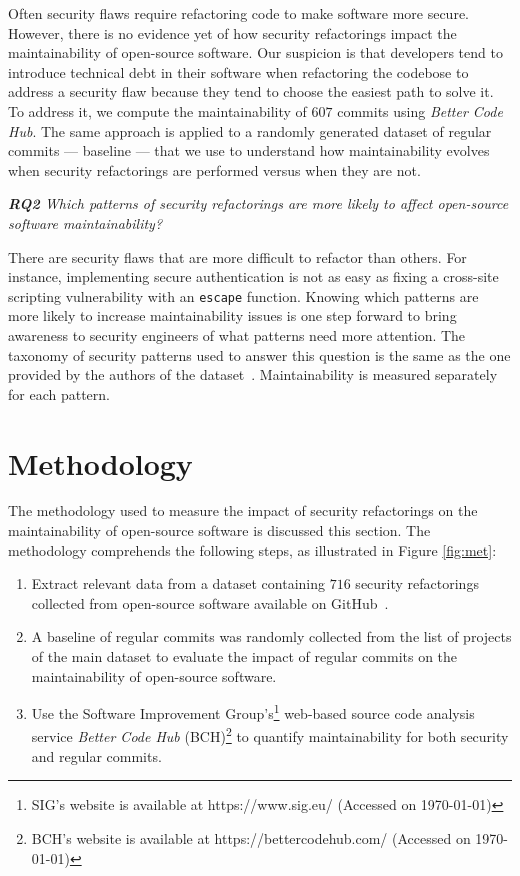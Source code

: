 \documentclass[10pt,conference]{IEEEtran}
\begin{document}
Often security flaws require refactoring code to make software more secure.
However, there is no evidence yet of how security refactorings impact the
maintainability of open-source software. Our suspicion is that developers tend
to introduce technical debt in their software when refactoring the codebose to
address a security flaw because they tend to choose the easiest path to solve
it. To address it, we compute the maintainability of $607$ commits using
\emph{Better Code Hub}. The same approach is applied to a randomly generated
dataset of regular commits --- baseline --- that we use to understand how
maintainability evolves when security refactorings are performed versus when
they are not.

\begin{framed}
\textit{\textbf{RQ2} Which patterns of security refactorings are more likely to
affect open-source software maintainability?}
\end{framed}

There are security flaws that are more difficult to refactor than others. For
instance, implementing secure authentication is not as easy as fixing a cross-site scripting vulnerability with an \texttt{escape}
function. Knowing which patterns are more likely to increase maintainability
issues is one step forward to bring awareness to security engineers of what
patterns need more attention. The taxonomy of security patterns used to answer
this question is the same as the one provided by the authors of the dataset~\cite{Reis:2017:IJSSE}.
Maintainability is measured separately for each pattern.
%
\section{Methodology}\label{sec:methodology}
%
The methodology used to measure the impact of security refactorings on the
maintainability of open-source software is discussed this section. The methodology 
comprehends the following steps, as illustrated in Figure \ref{fig:met}:
\begin{enumerate}
	\item Extract relevant data from a dataset containing
$716$ security refactorings collected from open-source software available on
GitHub~\cite{Reis:2017:IJSSE}.
	\item A baseline of regular commits was
randomly collected from the list of projects of the main dataset to evaluate the impact of regular commits on the maintainability of open-source
software.
\item Use the Software Improvement Group's\footnote{SIG's website is available
at https://www.sig.eu/ (Accessed on \today{})} web-based source code analysis
service \emph{Better Code Hub} (BCH)\footnote{BCH's website is available at
https://bettercodehub.com/ (Accessed on \today{})} to quantify
maintainability for both security and regular commits.
\end{enumerate}
\end{document}
